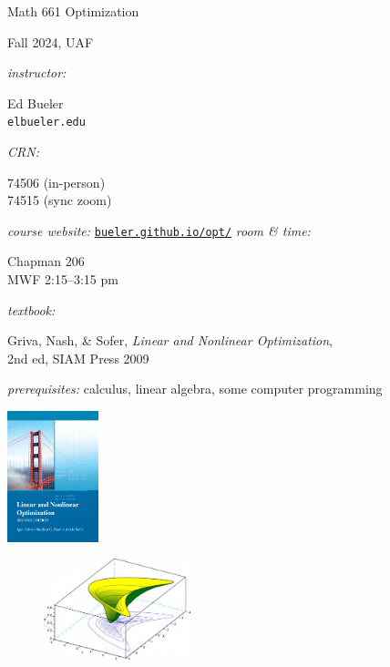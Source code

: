 \documentclass[12pt]{amsart}
\begin{document}
\begin{center}
\Huge Math 661 Optimization

\Large \medskip

Fall 2024, UAF
\end{center}

\thispagestyle{empty}
\bigskip\bigskip

\noindent \emph{instructor:} \begin{minipage}[t]{0.5\textwidth} Ed Bueler \\ \texttt{elbueler\@@alaska.edu} \end{minipage} \hfill \emph{CRN:}\, \begin{minipage}[t]{0.25\textwidth} 74506 (in-person) \\ 74515 (sync zoom) \end{minipage}

\medskip
\noindent \emph{course website:} \href{https://bueler.github.io/opt/}{\texttt{bueler.github.io/opt/}} \hfill \emph{room \& time:} \begin{minipage}[t]{0.25\textwidth} Chapman 206 \\ MWF 2:15--3:15 pm \end{minipage}

\medskip
\noindent \emph{textbook:} \begin{minipage}[t]{0.7\textwidth} Griva, Nash, \& Sofer, \emph{Linear and Nonlinear Optimization}, \\ 2nd ed, SIAM Press 2009 \end{minipage}

\bigskip
\noindent \emph{prerequisites:} calculus, linear algebra, some computer programming

\vspace{-16mm}
\hfill \includegraphics[height=38mm]{../../images/cover.jpg}

\vspace{5mm}

\begin{figure}
  \centering
    \includegraphics[width=0.38\textwidth]{../../images/banana.png}
\end{figure}
\end{document}
